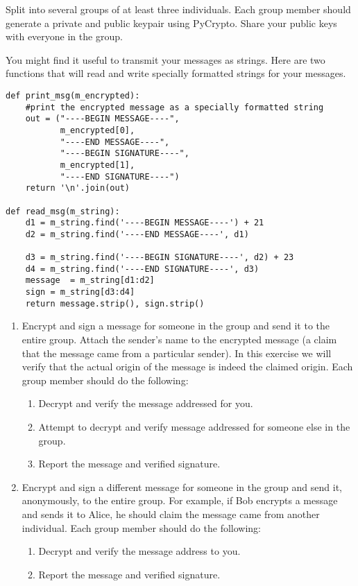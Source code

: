 \begin{problem}
Split into several groups of at least three individuals.
Each group member should generate a private and public keypair using PyCrypto.
Share your public keys with everyone in the group.

You might find it useful to transmit your messages as strings.
Here are two functions that will read and write specially formatted strings for your messages.
\begin{lstlisting}
def print_msg(m_encrypted):
    #print the encrypted message as a specially formatted string
    out = ("----BEGIN MESSAGE----",
           m_encrypted[0],
           "----END MESSAGE----",
           "----BEGIN SIGNATURE----",
           m_encrypted[1],
           "----END SIGNATURE----")
    return '\n'.join(out)

def read_msg(m_string):
    d1 = m_string.find('----BEGIN MESSAGE----') + 21
    d2 = m_string.find('----END MESSAGE----', d1)
    
    d3 = m_string.find('----BEGIN SIGNATURE----', d2) + 23
    d4 = m_string.find('----END SIGNATURE----', d3)
    message  = m_string[d1:d2]
    sign = m_string[d3:d4]
    return message.strip(), sign.strip()
\end{lstlisting}

\begin{enumerate}
\item Encrypt and sign a message for someone in the group and send it to the entire group.
Attach the sender's name to the encrypted message (a claim that the message came from a particular sender).
In this exercise we will verify that the actual origin of the message is indeed the claimed origin.
Each group member should do the following:
\begin{enumerate}
\item Decrypt and verify the message addressed for you.
\item Attempt to decrypt and verify message addressed for someone else in the group.
\item Report the message and verified signature.
\end{enumerate}

\item Encrypt and sign a different message for someone in the group and send it, anonymously, to the entire group.
For example, if Bob encrypts a message and sends it to Alice, he should claim the message came from another individual.
Each group member should do the following:
\begin{enumerate}
\item Decrypt and verify the message address to you.
\item Report the message and verified signature.
\end{enumerate}
\end{enumerate}
\end{problem}
